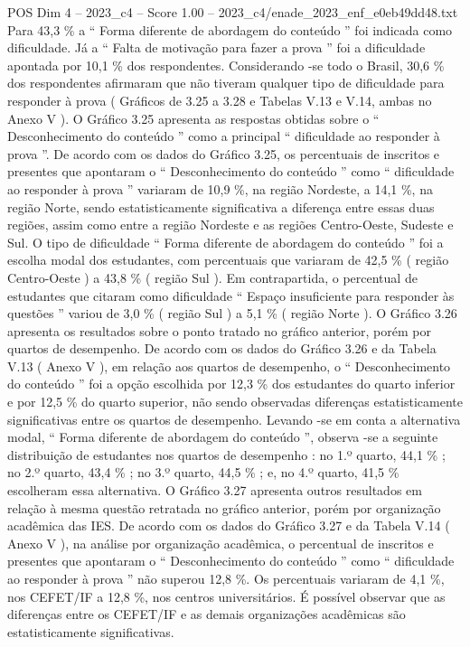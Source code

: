 \begin{textsample}{POS Dim 4 – 2023\_c4 – Score 1.00 – 2023\_c4/enade\_2023\_enf\_e0eb49dd48.txt}
Para 43,3 \% a “ Forma diferente de abordagem do conteúdo ” foi indicada como dificuldade.
Já a “ Falta de motivação para fazer a prova ” foi a dificuldade apontada por 10,1 \% dos respondentes.
Considerando -se todo o Brasil, 30,6 \% dos respondentes afirmaram que não tiveram qualquer tipo de dificuldade para responder à prova ( Gráficos de 3.25 a 3.28 e Tabelas V.13 e V.14, ambas no Anexo V ).
O Gráfico 3.25 apresenta as respostas obtidas sobre o “ Desconhecimento do conteúdo ” como a principal “ dificuldade ao responder à prova ”.
De acordo com os dados do Gráfico 3.25, os percentuais de inscritos e presentes que apontaram o “ Desconhecimento do conteúdo ” como “ dificuldade ao responder à prova ” variaram de 10,9 \%, na região Nordeste, a 14,1 \%, na região Norte, sendo estatisticamente significativa a diferença entre essas duas regiões, assim como entre a região Nordeste e as regiões Centro-Oeste, Sudeste e Sul.
O tipo de dificuldade “ Forma diferente de abordagem do conteúdo ” foi a escolha modal dos estudantes, com percentuais que variaram de 42,5 \% ( região Centro-Oeste ) a 43,8 \% ( região Sul ).
Em contrapartida, o percentual de estudantes que citaram como dificuldade “ Espaço insuficiente para responder às questões ” variou de 3,0 \% ( região Sul ) a 5,1 \% ( região Norte ).
O Gráfico 3.26 apresenta os resultados sobre o ponto tratado no gráfico anterior, porém por quartos de desempenho.
De acordo com os dados do Gráfico 3.26 e da Tabela V.13 ( Anexo V ), em relação aos quartos de desempenho, o “ Desconhecimento do conteúdo ” foi a opção escolhida por 12,3 \% dos estudantes do quarto inferior e por 12,5 \% do quarto superior, não sendo observadas diferenças estatisticamente significativas entre os quartos de desempenho.
Levando -se em conta a alternativa modal, “ Forma diferente de abordagem do conteúdo ”, observa -se a seguinte distribuição de estudantes nos quartos de desempenho : no 1.º quarto, 44,1 \% ; no 2.º quarto, 43,4 \% ; no 3.º quarto, 44,5 \% ; e, no 4.º quarto, 41,5 \% escolheram essa alternativa.
O Gráfico 3.27 apresenta outros resultados em relação à mesma questão retratada no gráfico anterior, porém por organização acadêmica das IES.
De acordo com os dados do Gráfico 3.27 e da Tabela V.14 ( Anexo V ), na análise por organização acadêmica, o percentual de inscritos e presentes que apontaram o “ Desconhecimento do conteúdo ” como “ dificuldade ao responder à prova ” não superou 12,8 \%.
Os percentuais variaram de 4,1 \%, nos CEFET/IF a 12,8 \%, nos centros universitários.
É possível observar que as diferenças entre os CEFET/IF e as demais organizações acadêmicas são estatisticamente significativas.

\end{textsample}

